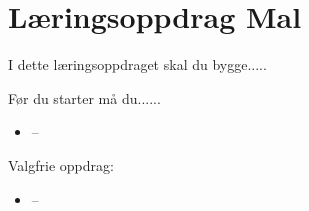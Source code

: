 
\noindent
\section*{Læringsoppdrag Mal}

\vskip 5pt
I dette læringsoppdraget skal du bygge.....

Før du  starter må du......
\begin{itemize}[noitemsep]
	\item --
\end{itemize}

\vskip 5pt 
Valgfrie oppdrag:

\vskip 5pt 
\begin{itemize}[noitemsep]
	\item --
\end{itemize}



